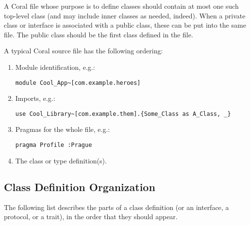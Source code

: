 A Coral file whose purpose is to define classes should contain at most one such top-level class (and may include inner classes as needed, indeed). When a private class or interface is associated with a public class, these can be put into the same file. The public class should be the first class defined in the file. 

A typical Coral source file has the following ordering: 
\begin{enumerate}
\item Module identification, e.g.:
\begin{lstlisting}
module Cool_App~[com.example.heroes]
\end{lstlisting}

\item Imports, e.g.:
\begin{lstlisting}
use Cool_Library~[com.example.them].{Some_Class as A_Class, _}
\end{lstlisting}

\item Pragmas for the whole file, e.g.:
\begin{lstlisting}
pragma Profile :Prague
\end{lstlisting}

\item The class or type definition(s). 
\end{enumerate}






\subsection{Class Definition Organization}

The following list describes the parts of a class definition (or an interface, a protocol, or a trait), in the order that they should appear. 

